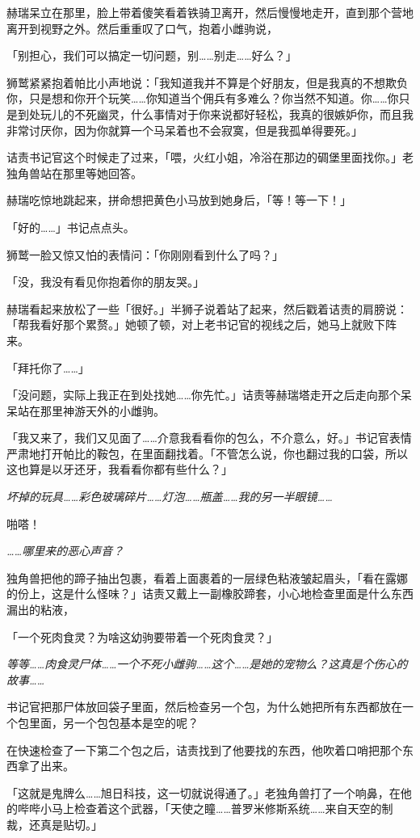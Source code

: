 赫瑞呆立在那里，脸上带着傻笑看着铁骑卫离开，然后慢慢地走开，直到那个营地离开到视野之外。然后重重叹了口气，抱着小雌驹说，

「别担心，我们可以搞定一切问题，别……别走……好么？」

狮鹫紧紧抱着帕比小声地说：「我知道我并不算是个好朋友，但是我真的不想欺负你，只是想和你开个玩笑……你知道当个佣兵有多难么？你当然不知道。你……你只是到处玩儿的不死幽灵，什么事情对于你来说都好轻松，我真的很嫉妒你，而且我非常讨厌你，因为你就算一个马呆着也不会寂寞，但是我孤单得要死。」

诘责书记官这个时候走了过来，「喂，火红小姐，冷浴在那边的碉堡里面找你。」老独角兽站在那里等她回答。

赫瑞吃惊地跳起来，拼命想把黄色小马放到她身后，「等！等一下！」

「好的……」书记点点头。

狮鹫一脸又惊又怕的表情问：「你刚刚看到什么了吗？」

「没，我没有看见你抱着你的朋友哭。」

赫瑞看起来放松了一些「很好。」半狮子说着站了起来，然后戳着诘责的肩膀说：「帮我看好那个累赘。」她顿了顿，对上老书记官的视线之后，她马上就败下阵来。

「拜托你了……」

「没问题，实际上我正在到处找她……你先忙。」诘责等赫瑞塔走开之后走向那个呆呆站在那里神游天外的小雌驹。

「我又来了，我们又见面了……介意我看看你的包么，不介意么，好。」书记官表情严肃地打开帕比的鞍包，在里面翻找着。「不管怎么说，你也翻过我的口袋，所以这也算是以牙还牙，我看看你都有些什么？」

\emph{坏掉的玩具……彩色玻璃碎片……灯泡……瓶盖……我的另一半眼镜……}

啪嗒！

\emph{……哪里来的恶心声音？}

独角兽把他的蹄子抽出包裹，看着上面裹着的一层绿色粘液皱起眉头，「看在露娜的份上，这是什么怪味？」诘责又戴上一副橡胶蹄套，小心地检查里面是什么东西漏出的粘液，

「一个死肉食灵？为啥这幼驹要带着一个死肉食灵？」

\emph{等等……肉食灵尸体……一个不死小雌驹……这个……是她的宠物么？这真是个伤心的故事……{}}

书记官把那尸体放回袋子里面，然后检查另一个包，为什么她把所有东西都放在一个包里面，另一个包包基本是空的呢？

在快速检查了一下第二个包之后，诘责找到了他要找的东西，他吹着口哨把那个东西拿了出来。

「这就是鬼牌么……旭日科技，这一切就说得通了。」老独角兽打了一个响鼻，在他的哔哔小马上检查着这个武器，「天使之瞳……普罗米修斯系统……来自天空的制裁，还真是贴切。」

